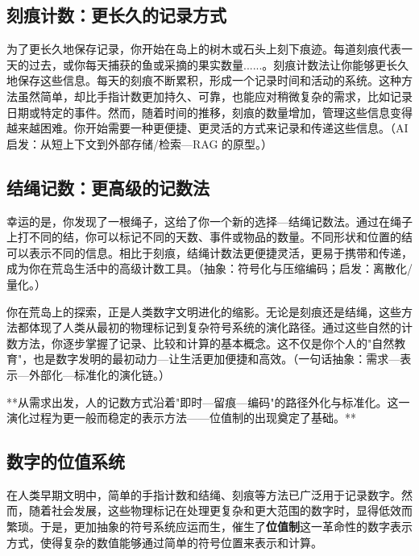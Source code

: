 \subsection*{刻痕计数：更长久的记录方式}


为了更长久地保存记录，你开始在岛上的树木或石头上刻下痕迹。每道刻痕代表一天的过去，或你每天捕获的鱼或采摘的果实数量......。刻痕计数法让你能够更长久地保存这些信息。每天的刻痕不断累积，形成一个记录时间和活动的系统。这种方法虽然简单，却比手指计数更加持久、可靠，也能应对稍微复杂的需求，比如记录日期或特定的事件。然而，随着时间的推移，刻痕的数量增加，管理这些信息变得越来越困难。你开始需要一种更便捷、更灵活的方式来记录和传递这些信息。{（AI 启发：从短上下文到外部存储/检索---RAG 的原型。）}

\subsection*{结绳记数：更高级的记数法}


幸运的是，你发现了一根绳子，这给了你一个新的选择---结绳记数法。通过在绳子上打不同的结，你可以标记不同的天数、事件或物品的数量。不同形状和位置的结可以表示不同的信息。相比于刻痕，结绳计数法更便捷灵活，更易于携带和传递，成为你在荒岛生活中的高级计数工具。{（抽象：符号化与压缩编码；启发：离散化/量化。）}

你在荒岛上的探索，正是人类数字文明进化的缩影。无论是刻痕还是结绳，这些方法都体现了人类从最初的物理标记到复杂符号系统的演化路径。通过这些自然的计数方法，你逐步掌握了记录、比较和计算的基本概念。这不仅是你个人的"自然教育"，也是数字发明的最初动力---让生活更加便捷和高效。{（一句话抽象：需求—表示—外部化—标准化的演化链。）}

**从需求出发，人的记数方式沿着"即时—留痕—编码"的路径外化与标准化。这一演化过程为更一般而稳定的表示方法——位值制的出现奠定了基础。**

\subsection{数字的位值系统}


在人类早期文明中，简单的手指计数和结绳、刻痕等方法已广泛用于记录数字。然而，随着社会发展，这些物理标记在处理更复杂和更大范围的数字时，显得低效而繁琐。于是，更加抽象的符号系统应运而生，催生了{\bf 位值制}这一革命性的数字表示方式，使得复杂的数值能够通过简单的符号位置来表示和计算。

